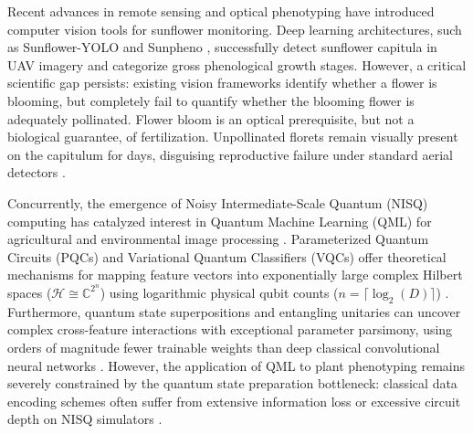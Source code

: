 \documentclass{ieeeaccess}
\begin{document}
Recent advances in remote sensing and optical phenotyping have introduced computer vision tools for sunflower monitoring. Deep learning architectures, such as Sunflower-YOLO \cite{jing2024sunflower} and Sunpheno \cite{luoni2024sunpheno}, successfully detect sunflower capitula in UAV imagery and categorize gross phenological growth stages. However, a critical scientific gap persists: existing vision frameworks identify whether a flower is blooming, but completely fail to quantify whether the blooming flower is adequately pollinated. Flower bloom is an optical prerequisite, but not a biological guarantee, of fertilization. Unpollinated florets remain visually present on the capitulum for days, disguising reproductive failure under standard aerial detectors \cite{smith2025remote}.

Concurrently, the emergence of Noisy Intermediate-Scale Quantum (NISQ) computing has catalyzed interest in Quantum Machine Learning (QML) for agricultural and environmental image processing \cite{biamonte2017quantum, henderson2020quanvolutional, schuld2020circuit}. Parameterized Quantum Circuits (PQCs) and Variational Quantum Classifiers (VQCs) offer theoretical mechanisms for mapping feature vectors into exponentially large complex Hilbert spaces ($\mathcal{H} \cong \mathbb{C}^{2^n}$) using logarithmic physical qubit counts ($n = \lceil \log_2(D) \rceil$) \cite{schuld2019quantum}. Furthermore, quantum state superpositions and entangling unitaries can uncover complex cross-feature interactions with exceptional parameter parsimony, using orders of magnitude fewer trainable weights than deep classical convolutional neural networks \cite{cerezo2021variational}. However, the application of QML to plant phenotyping remains severely constrained by the quantum state preparation bottleneck: classical data encoding schemes often suffer from extensive information loss or excessive circuit depth on NISQ simulators \cite{schuld2021supervised}.
\end{document}
